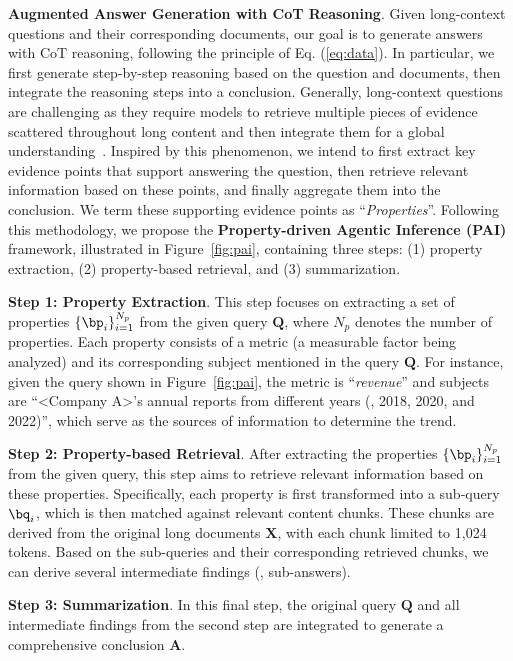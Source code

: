 \noindent \textbf{Augmented Answer Generation with CoT Reasoning}.
Given long-context questions and their corresponding documents, our goal is to generate answers with CoT reasoning, following the principle of Eq. (\ref{eq:data}). In particular, we first generate step-by-step reasoning based on the question and documents, then integrate the reasoning steps into a conclusion.
Generally, long-context questions are challenging as they require models to retrieve multiple pieces of evidence scattered throughout long content and then integrate them for a global understanding~\cite{wang2024leave,edge2024local}. Inspired by this phenomenon, we intend to first extract key evidence points that support answering the question, then retrieve relevant information based on these points, and finally aggregate them into the conclusion. We term these supporting evidence points as ``\textit{Properties}''.
Following this methodology, we propose the \textbf{Property-driven Agentic Inference (PAI)} framework, illustrated in Figure~\ref{fig:pai}, containing three steps: (1) property extraction, (2) property-based retrieval, and (3) summarization.

\textbf{Step 1: Property Extraction}. This step focuses on extracting a set of properties $\{\bp_i\}^{N_p}_{i=1}$ from the given query $\mathbf{Q}$, where $N_p$ denotes the number of properties. Each property consists of a metric (a measurable factor being analyzed) and its corresponding subject mentioned in the query $\mathbf{Q}$. For instance, given the query shown in Figure~\ref{fig:pai}, the metric is ``\textit{revenue}'' and subjects are ``<Company A>'s annual reports from different years (\eg, 2018, 2020, and 2022)'', which serve as the sources of information to determine the trend.

\textbf{Step 2: Property-based Retrieval}. After extracting the properties $\{\bp_i\}^{N_p}_{i=1}$ from the given query, this step aims to retrieve relevant information based on these properties. Specifically, each property is first transformed into a sub-query $\bq_i$, which is then matched against relevant content chunks. These chunks are derived from the original long documents $\mathbf{X}$, with each chunk limited to 1,024 tokens. Based on the sub-queries and their corresponding retrieved chunks, we can derive several intermediate findings (\ie, sub-answers).

\textbf{Step 3: Summarization}. In this final step, the original query $\mathbf{Q}$ and all intermediate findings from the second step are integrated to generate a comprehensive conclusion $\mathbf{A}$.

